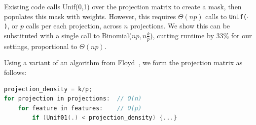 \documentclass[sigconf]{acmart}%
\begin{document}
Existing code calls Unif(0,1) over the projection matrix to create a mask, then populates this mask with weights. However, this requires $\Theta(np)$ calls to {\tt Unif($\cdot$)}, or $p$ calls per each projection, across $n$ projections. We show this can be substituted with a single call to Binomial($np, n\frac{k}{p}$), cutting runtime by 33\% for our settings, proportional to $\Theta(np)$.

Using a variant of an algorithm from Floyd~\cite{10.1145/30401.315746}, we form the projection matrix as follows:

\begin{lstlisting}[language=c++]
projection_density = k/p;
for projection in projections:  // O(n)
    for feature in features:    // O(p)
        if (Unif01(.) < projection_density) {...}
\end{lstlisting}

%
%
%

\end{document}
